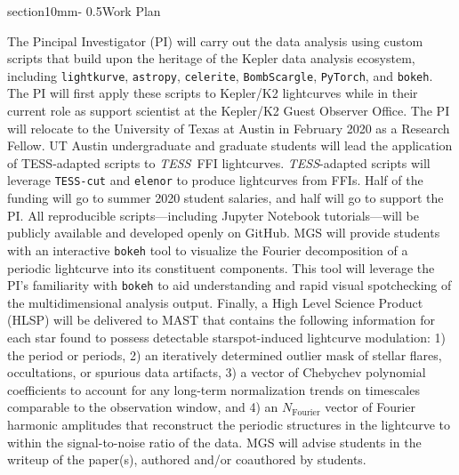 \documentclass[letterpaper,11pt]{article}
\makeatletter
\renewcommand{\section}{\@startsection%
{section}{1}{0mm}{-\baselineskip}%
{0.5\baselineskip}{\normalfont\Large\bfseries}}%
\newcommand{\tess}{{\it TESS}}
\makeatother
\begin{document}
\section{Work Plan}

The Pincipal Investigator (PI) will carry out the data analysis using custom scripts that build upon the heritage of the Kepler data analysis ecosystem, including \texttt{lightkurve}, \texttt{astropy}, \texttt{celerite}, \texttt{BombScargle}, \texttt{PyTorch}, and \texttt{bokeh}.  The PI will first apply these scripts to Kepler/K2 lightcurves while in their current role as support scientist at the Kepler/K2 Guest Observer Office.  The PI will relocate to the University of Texas at Austin in February 2020 as a Research Fellow.  UT Austin undergraduate and graduate students will lead the application of TESS-adapted scripts to \tess\ FFI lightcurves.  \tess-adapted scripts will leverage \texttt{TESS-cut} and \texttt{elenor} to produce lightcurves from FFIs.  Half of the funding will go to summer 2020 student salaries, and half will go to support the PI.  All reproducible scripts---including Jupyter Notebook tutorials---will be publicly available and developed openly on GitHub.  MGS will provide students with an interactive \texttt{bokeh} tool to visualize the Fourier decomposition of a periodic lightcurve into its constituent components.  This tool will leverage the PI's familiarity with \texttt{bokeh} to aid understanding and rapid visual spotchecking of the multidimensional analysis output.  Finally, a High Level Science Product (HLSP) will be delivered to MAST that contains the following information for each star found to possess detectable starspot-induced lightcurve modulation: 1) the period or periods, 2) an iteratively determined outlier mask of stellar flares, occultations, or spurious data artifacts, 3) a vector of Chebychev polynomial coefficients to account for any long-term normalization trends on timescales comparable to the observation window, and 4) an $N_{\mathrm{Fourier}}$ vector of Fourier harmonic amplitudes that reconstruct the periodic structures in the lightcurve to within the signal-to-noise ratio of the data.  MGS will advise students in the writeup of the paper(s), authored and/or coauthored by students.


\end{document}
